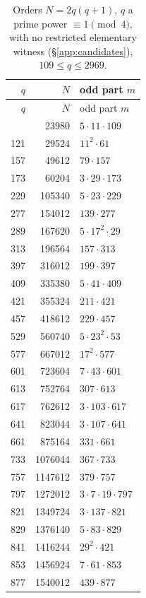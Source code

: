\documentclass[11pt]{article}
\begin{document}
{\footnotesize
\begin{longtable}{r r l}
\caption{Orders \(N=2q(q+1)\), \(q\) a prime power \(\equiv1\pmod4\),
with no restricted elementary witness (\S\ref{app:candidates}),
\(109\le q\le2969\).}\label{tab:candidates}\\
\hline
\(q\) & \(N\) & odd part \(m\)\\\hline
\endfirsthead
\hline
\(q\) & \(N\) & odd part \(m\)\\\hline
\endhead
\hline
\endfoot
109 & 23980 & \(5\cdot11\cdot109\) \\
121 & 29524 & \(11^{2}\cdot61\) \\
157 & 49612 & \(79\cdot157\) \\
173 & 60204 & \(3\cdot29\cdot173\) \\
229 & 105340 & \(5\cdot23\cdot229\) \\
277 & 154012 & \(139\cdot277\) \\
289 & 167620 & \(5\cdot17^{2}\cdot29\) \\
313 & 196564 & \(157\cdot313\) \\
397 & 316012 & \(199\cdot397\) \\
409 & 335380 & \(5\cdot41\cdot409\) \\
421 & 355324 & \(211\cdot421\) \\
457 & 418612 & \(229\cdot457\) \\
529 & 560740 & \(5\cdot23^{2}\cdot53\) \\
577 & 667012 & \(17^{2}\cdot577\) \\
601 & 723604 & \(7\cdot43\cdot601\) \\
613 & 752764 & \(307\cdot613\) \\
617 & 762612 & \(3\cdot103\cdot617\) \\
641 & 823044 & \(3\cdot107\cdot641\) \\
661 & 875164 & \(331\cdot661\) \\
733 & 1076044 & \(367\cdot733\) \\
757 & 1147612 & \(379\cdot757\) \\
797 & 1272012 & \(3\cdot7\cdot19\cdot797\) \\
821 & 1349724 & \(3\cdot137\cdot821\) \\
829 & 1376140 & \(5\cdot83\cdot829\) \\
841 & 1416244 & \(29^{2}\cdot421\) \\
853 & 1456924 & \(7\cdot61\cdot853\) \\
877 & 1540012 & \(439\cdot877\) \\

\end{longtable}}
\end{document}

